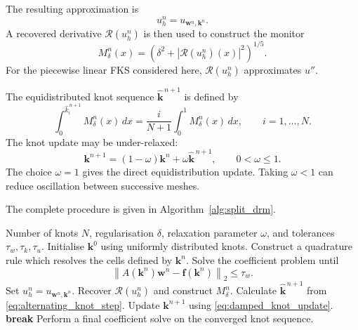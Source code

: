 \documentclass[11pt, onecolumn]{report}
\begin{document}
The resulting approximation is
\begin{equation*}
    u_h^n
    =
    u_{\mathbf w^n,\mathbf k^n}.
\end{equation*}
A recovered derivative \(\mathcal R(u_h^n)\) is then used to construct the monitor
\begin{equation*}
    M_\delta^n(x)
    =
    \left(
        \delta^2+
        \left|\mathcal R(u_h^n)(x)\right|^2
    \right)^{1/5}.
\end{equation*}
For the piecewise linear FKS considered here, \(\mathcal R(u_h^n)\) approximates \(u''\).

The equidistributed knot sequence
\(\widehat{\mathbf k}^{\,n+1}\) is defined by
\begin{equation}
    \int_0^{\widehat{k}^{\,n+1}_i}
    M_\delta^n(x)\,dx
    =
    \frac{i}{N+1}
    \int_0^1M_\delta^n(x)\,dx,
    \qquad i=1,\ldots,N.
    \label{eq:alternating_knot_step}
\end{equation}
The knot update may be under-relaxed:
\begin{equation}
    \mathbf k^{n+1}
    =
    (1-\omega)\mathbf k^n
    +
    \omega\widehat{\mathbf k}^{\,n+1},
    \qquad 0<\omega\leq1.
    \label{eq:damped_knot_update}
\end{equation}
The choice \(\omega=1\) gives the direct equidistribution update. Taking \(\omega<1\) can reduce oscillation between successive meshes.

The complete procedure is given in Algorithm~\ref{alg:split_drm}.

\begin{algorithm}[t]
\caption{Split Deep Ritz training}
\label{alg:split_drm}
\begin{algorithmic}[1]
\Require Number of knots \(N\), regularisation \(\delta\), relaxation parameter \(\omega\), and tolerances \(\tau_w,\tau_k,\tau_u\).
\State Initialise \(\mathbf k^0\) using uniformly distributed knots.
    \State Construct a quadrature rule which resolves the cells defined by \(\mathbf k^n\).
    \State Solve the coefficient problem until
    \[
        \left\|
            A(\mathbf k^n)\mathbf w^n
            -
            \mathbf f(\mathbf k^n)
        \right\|_2
        \leq\tau_w.
    \]
    \State Set \(u_h^n=u_{\mathbf w^n,\mathbf k^n}\).
    \State Recover \(\mathcal R(u_h^n)\) and construct \(M_\delta^n\).
    \State Calculate \(\widehat{\mathbf k}^{\,n+1}\) from
    \eqref{eq:alternating_knot_step}.
    \State Update \(\mathbf k^{n+1}\) using
    \eqref{eq:damped_knot_update}.
        \State \textbf{break}
    \EndIf
\EndFor
\State Perform a final coefficient solve on the converged knot sequence.
\end{algorithmic}
\end{algorithm}
\end{document}
